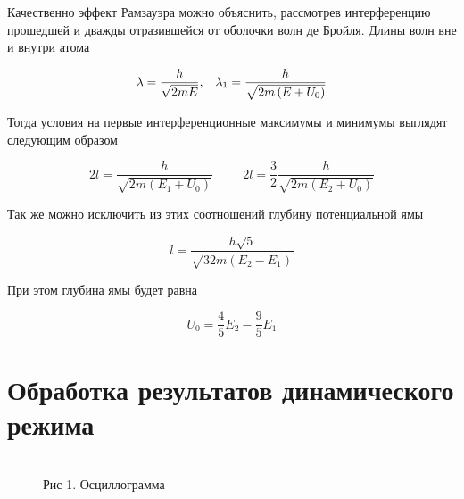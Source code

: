 \documentclass[12pt]{article}
\begin{document}
    Качественно эффект Рамзауэра можно объяснить, рассмотрев интерференцию
    прошедшей и дважды отразившейся от оболочки волн де Бройля. Длины волн вне и
    внутри атома

    $$
      \lambda = \frac{h}{\sqrt{2 m E}}, \hspace{0.3cm}
      \lambda_1 = \frac{h}{\sqrt{2 m \left(E + U_0\right)}}
    $$

    Тогда условия на первые интерференционные максимумы и минимумы выглядят
    следующим образом

    \begin{equation}
      2 l = \frac{h}{\sqrt{2 m \left(E_1 + U_0\right)}}
      \hspace{1cm}
      2 l = \frac{3}{2} \frac{h}{\sqrt{2 m \left(E_2 + U_0\right)}}
      \label{eq:max_min_gain_weakening}
    \end{equation}

    Так же можно исключить из этих соотношений глубину потенциальной ямы

    \begin{equation}
      l = \frac{h \sqrt{5}}{\sqrt{32 m \left( E_2 - E_1 \right)}}
      \label{eq:atom_size}
    \end{equation}

    При этом глубина ямы будет равна

    \begin{equation}
      U_0 = \frac{4}{5} E_2 - \frac{9}{5} E_1
      \label{eq:potential_pit_depth}
    \end{equation}

  \section{Обработка результатов динамического режима}

  \begin{figure}[h!]
    \\
    Рис 1. Осциллограмма
    \label{fig:oscillograme}
  \end{figure}
\end{document}
